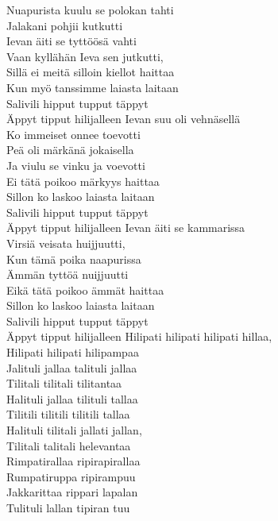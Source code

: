 \begin{flushleft}
Nuapurista kuulu se polokan tahti\\
Jalakani pohjii kutkutti\\
Ievan äiti se tyttöösä vahti\\
Vaan kyllähän Ieva sen jutkutti,\\
Sillä ei meitä silloin kiellot haittaa\\
Kun myö tanssimme laiasta laitaan\\
Salivili hipput tupput täppyt\\
Äppyt tipput hilijalleen
\hop
Ievan suu oli vehnäsellä\\
Ko immeiset onnee toevotti\\
Peä oli märkänä jokaisella\\
Ja viulu se vinku ja voevotti\\
Ei tätä poikoo märkyys haittaa\\
Sillon ko laskoo laiasta laitaan\\
Salivili hipput tupput täppyt\\
Äppyt tipput hilijalleen
\hop
Ievan äiti se kammarissa\\
Virsiä veisata huijjuutti,\\
Kun tämä poika naapurissa\\
Ämmän tyttöä nuijjuutti\\
Eikä tätä poikoo ämmät haittaa\\
Sillon ko laskoo laiasta laitaan\\
Salivili hipput tupput täppyt\\
Äppyt tipput hilijalleen
\hop
Hilipati hilipati hilipati hillaa,\\
Hilipati hilipati hilipampaa\\
Jalituli jallaa talituli jallaa\\
Tilitali tilitali tilitantaa\\
Halituli jallaa tilituli tallaa\\
Tilitili tilitili tilitili tallaa\\
Halituli tilitali jallati jallan,\\
Tilitali talitali helevantaa\\
\hop
Rimpatirallaa ripirapirallaa\\
Rumpatiruppa ripirampuu\\
Jakkarittaa rippari lapalan\\
Tulituli lallan tipiran tuu\\

\end{flushleft}
